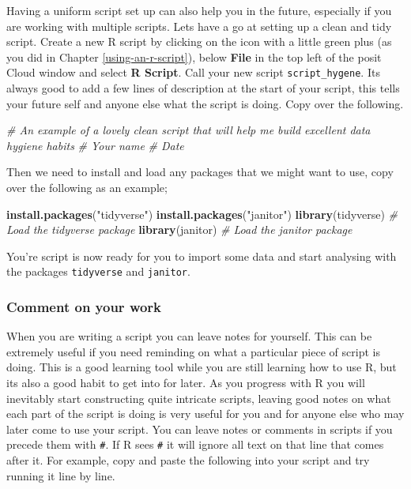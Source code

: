 \documentclass[
]{book}
\newenvironment{Shaded}{\begin{snugshade}}{\end{snugshade}}
\newcommand{\CommentTok}[1]{\textcolor[rgb]{0.56,0.35,0.01}{\textit{#1}}}
\newcommand{\FunctionTok}[1]{\textcolor[rgb]{0.13,0.29,0.53}{\textbf{#1}}}
\newcommand{\NormalTok}[1]{#1}
\newcommand{\StringTok}[1]{\textcolor[rgb]{0.31,0.60,0.02}{#1}}
\begin{document}
Having a uniform script set up can also help you in the future, especially if you are working with multiple scripts. Lets have a go at setting up a clean and tidy script.
Create a new R script by clicking on the icon with a little green plus (as you did in Chapter \ref{using-an-r-script}), below \textbf{File} in the top left of the posit Cloud window and select \textbf{R Script}. Call your new script \texttt{script\_hygene}. Its always good to add a few lines of description at the start of your script, this tells your future self and anyone else what the script is doing. Copy over the following.

\begin{Shaded}
\begin{Highlighting}[]
\CommentTok{\# An example of a lovely clean script that will help me build excellent data hygiene habits}
\CommentTok{\# Your name}
\CommentTok{\# Date}
\end{Highlighting}
\end{Shaded}

Then we need to install and load any packages that we might want to use, copy over the following as an example;

\begin{Shaded}
\begin{Highlighting}[]
\FunctionTok{install.packages}\NormalTok{(}\StringTok{"tidyverse"}\NormalTok{)}
\FunctionTok{install.packages}\NormalTok{(}\StringTok{"janitor"}\NormalTok{)}
\FunctionTok{library}\NormalTok{(tidyverse) }\CommentTok{\# Load the tidyverse package}
\FunctionTok{library}\NormalTok{(janitor) }\CommentTok{\# Load the janitor package}
\end{Highlighting}
\end{Shaded}

You're script is now ready for you to import some data and start analysing with the packages \texttt{tidyverse} and \texttt{janitor}.

\subsubsection{Comment on your work}\label{comment-on-your-work}

When you are writing a script you can leave notes for yourself. This can be extremely useful if you need reminding on what a particular piece of script is doing. This is a good learning tool while you are still learning how to use R, but its also a good habit to get into for later. As you progress with R you will inevitably start constructing quite intricate scripts, leaving good notes on what each part of the script is doing is very useful for you and for anyone else who may later come to use your script. You can leave notes or comments in scripts if you precede them with \texttt{\#}. If R sees \texttt{\#} it will ignore all text on that line that comes after it. For example, copy and paste the following into your script and try running it line by line.
\end{document}
